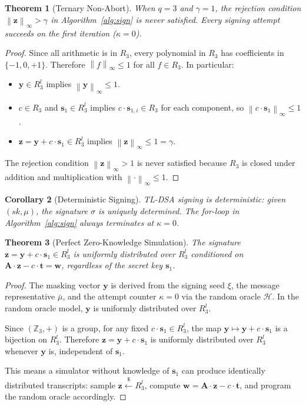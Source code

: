 \documentclass[11pt,a4paper]{article}
\newtheorem{theorem}{Theorem}[section]
\newtheorem{corollary}[theorem]{Corollary}
\theoremstyle{definition}
\newcommand{\Z}{\mathbb{Z}}
\newcommand{\linf}[1]{\left\lVert #1 \right\rVert_{\infty}}
\begin{document}
\begin{theorem}[Ternary Non-Abort]
\label{thm:nonabort}
When $q = 3$ and $\gamma = 1$, the rejection condition $\linf{\mathbf{z}} > \gamma$ in Algorithm~\ref{alg:sign} is never satisfied. Every signing attempt succeeds on the first iteration ($\kappa = 0$).
\end{theorem}

\begin{proof}
Since all arithmetic is in $R_3$, every polynomial in $R_3$ has coefficients in $\{-1, 0, +1\}$. Therefore $\linf{f} \leq 1$ for all $f \in R_3$. In particular:
\begin{itemize}
\item $\mathbf{y} \in R_3^l$ implies $\linf{\mathbf{y}} \leq 1$.
\item $c \in R_3$ and $\mathbf{s}_1 \in R_3^l$ implies $c \cdot \mathbf{s}_{1,i} \in R_3$ for each component, so $\linf{c \cdot \mathbf{s}_1} \leq 1$.
\item $\mathbf{z} = \mathbf{y} + c \cdot \mathbf{s}_1 \in R_3^l$ implies $\linf{\mathbf{z}} \leq 1 = \gamma$.
\end{itemize}
The rejection condition $\linf{\mathbf{z}} > 1$ is never satisfied because $R_3$ is closed under addition and multiplication with $\linf{\cdot} \leq 1$.
\end{proof}

\begin{corollary}[Deterministic Signing]
\label{cor:deterministic}
TL-DSA signing is deterministic: given $(\textit{sk}, \mu)$, the signature $\sigma$ is uniquely determined. The for-loop in Algorithm~\ref{alg:sign} always terminates at $\kappa = 0$.
\end{corollary}

\begin{theorem}[Perfect Zero-Knowledge Simulation]
\label{thm:zk}
The signature $\mathbf{z} = \mathbf{y} + c \cdot \mathbf{s}_1 \in R_3^l$ is uniformly distributed over $R_3^l$ conditioned on $\mathbf{A} \cdot \mathbf{z} - c \cdot \mathbf{t} = \mathbf{w}$, regardless of the secret key $\mathbf{s}_1$.
\end{theorem}

\begin{proof}
The masking vector $\mathbf{y}$ is derived from the signing seed $\xi$, the message representative $\bar{\mu}$, and the attempt counter $\kappa = 0$ via the random oracle $\mathcal{H}$. In the random oracle model, $\mathbf{y}$ is uniformly distributed over $R_3^l$.

Since $(\Z_3, +)$ is a group, for any fixed $c \cdot \mathbf{s}_1 \in R_3^l$, the map $\mathbf{y} \mapsto \mathbf{y} + c \cdot \mathbf{s}_1$ is a bijection on $R_3^l$. Therefore $\mathbf{z} = \mathbf{y} + c \cdot \mathbf{s}_1$ is uniformly distributed over $R_3^l$ whenever $\mathbf{y}$ is, independent of $\mathbf{s}_1$.

This means a simulator without knowledge of $\mathbf{s}_1$ can produce identically distributed transcripts: sample $\mathbf{z} \xleftarrow{\$} R_3^l$, compute $\mathbf{w} = \mathbf{A} \cdot \mathbf{z} - c \cdot \mathbf{t}$, and program the random oracle accordingly.
\end{proof}
\end{document}
